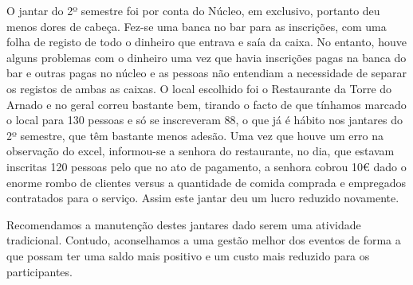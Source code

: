 O jantar do 2º semestre foi por conta do Núcleo, em exclusivo, portanto deu menos dores de cabeça. Fez-se uma banca no bar para as inscrições, com uma folha de registo de todo o dinheiro que entrava e saía da caixa. No entanto, houve alguns problemas com o dinheiro uma vez que havia inscrições pagas na banca do bar e outras pagas no núcleo e as pessoas não entendiam a necessidade de separar os registos de ambas as caixas.
O local escolhido foi o Restaurante da Torre do Arnado e no geral correu bastante bem, tirando o facto de que tínhamos marcado o local para 130 pessoas e só se inscreveram 88, o que já é hábito nos jantares do 2º semestre, que têm bastante menos adesão. Uma vez que houve um erro na observação do excel, informou-se a senhora do restaurante, no dia, que estavam inscritas 120 pessoas pelo que no ato de pagamento, a senhora cobrou 10€ dado o enorme rombo de clientes versus a quantidade de comida comprada e empregados contratados para o serviço. Assim este jantar deu um lucro reduzido novamente.

Recomendamos a manutenção destes jantares dado serem uma atividade tradicional. Contudo, aconselhamos a uma gestão melhor dos eventos de forma a que possam ter uma saldo mais positivo e um custo mais reduzido para os participantes.

